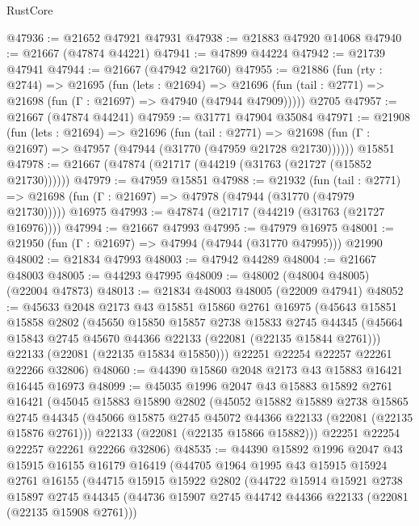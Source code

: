 \begin{lexlean}{RustCore}
\begin{coremodule}
@47936 := @21652 @47921 @47931
@47938 := @21883 @47920 @14068
@47940 := @21667 (@47874 @44221)
@47941 := @47899 @44224
@47942 := @21739 @47941
@47944 := @21667 (@47942 @21760)
@47955 := @21886
    (fun (rty : @2744) =>
    @21695
      (fun (lets : @21694) =>
      @21696 (fun (tail : @2771) => @21698 (fun (Γ : @21697) => @47940 (@47944 @47909)))))
    @2705
@47957 := @21667 (@47874 @44241)
@47959 := @31771 @47904 @35084
@47971 := @21908
    (fun (lets : @21694) =>
    @21696
      (fun (tail : @2771) =>
      @21698 (fun (Γ : @21697) => @47957 (@47944 (@31770 (@47959 @21728 @21730))))))
    @15851
@47978 := @21667 (@47874 (@21717 (@44219 (@31763 (@21727 (@15852 @21730))))))
@47979 := @47959 @15851
@47988 := @21932
    (fun (tail : @2771) => @21698 (fun (Γ : @21697) => @47978 (@47944 (@31770 (@47979 @21730)))))
    @16975
@47993 := @47874 (@21717 (@44219 (@31763 (@21727 @16976))))
@47994 := @21667 @47993
@47995 := @47979 @16975
@48001 := @21950 (fun (Γ : @21697) => @47994 (@47944 (@31770 @47995))) @21990
@48002 := @21834 @47993
@48003 := @47942 @44289
@48004 := @21667 @48003
@48005 := @44293 @47995
@48009 := @48002 (@48004 @48005) (@22004 @47873)
@48013 := @21834 @48003 @48005 (@22009 @47941)
@48052 := @45633
    @2048
    @2173
    @43
    @15851
    @15860
    @2761
    @16975
    (@45643
      @15851
      @15858
      @2802
      (@45650
        @15850
        @15857
        @2738
        @15833
        @2745
        @44345
        (@45664 @15843 @2745 @45670 @44366 @22133 (@22081 (@22135 @15844 @2761)))
        @22133
        (@22081 (@22135 @15834 @15850)))
      @22251
      @22254
      @22257
      @22261
      @22266
      @32806)
@48060 := @44390 @15860 @2048 @2173 @43 @15883 @16421 @16445 @16973
@48099 := @45035
    @1996
    @2047
    @43
    @15883
    @15892
    @2761
    @16421
    (@45045
      @15883
      @15890
      @2802
      (@45052
        @15882
        @15889
        @2738
        @15865
        @2745
        @44345
        (@45066 @15875 @2745 @45072 @44366 @22133 (@22081 (@22135 @15876 @2761)))
        @22133
        (@22081 (@22135 @15866 @15882)))
      @22251
      @22254
      @22257
      @22261
      @22266
      @32806)
@48535 := @44390
    @15892
    @1996
    @2047
    @43
    @15915
    @16155
    @16179
    @16419
    (@44705
      @1964
      @1995
      @43
      @15915
      @15924
      @2761
      @16155
      (@44715
        @15915
        @15922
        @2802
        (@44722
          @15914
          @15921
          @2738
          @15897
          @2745
          @44345
          (@44736 @15907 @2745 @44742 @44366 @22133 (@22081 (@22135 @15908 @2761)))

\end{coremodule}
\end{lexlean}
